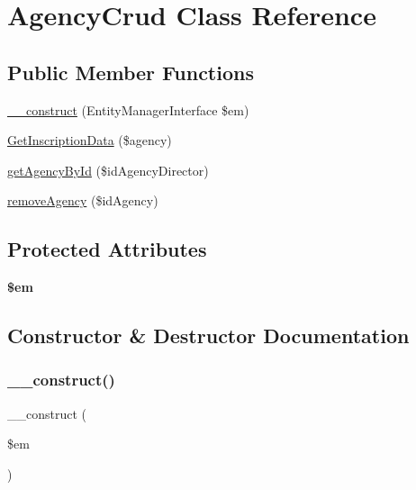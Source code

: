 \hypertarget{class_app_1_1_d_a_l_1_1_agency_crud}{}\section{Agency\+Crud Class Reference}
\label{class_app_1_1_d_a_l_1_1_agency_crud}
\subsection*{Public Member Functions}
\begin{DoxyCompactItemize}
\item 
\mbox{\hyperlink{class_app_1_1_d_a_l_1_1_agency_crud_a25f4258aeb5ce2a61a2504cb7c058485}{\+\_\+\+\_\+construct}} (Entity\+Manager\+Interface \$em)
\item 
\mbox{\hyperlink{class_app_1_1_d_a_l_1_1_agency_crud_a6be585abbc3ecd13be7ce55b17684201}{Get\+Inscription\+Data}} (\$agency)
\item 
\mbox{\hyperlink{class_app_1_1_d_a_l_1_1_agency_crud_a54229573070f2b5cf281e41d8df7a469}{get\+Agency\+By\+Id}} (\$id\+Agency\+Director)
\item 
\mbox{\hyperlink{class_app_1_1_d_a_l_1_1_agency_crud_aaed7f556480a380f61b2a61cac7c83e9}{remove\+Agency}} (\$id\+Agency)
\end{DoxyCompactItemize}
\subsection*{Protected Attributes}
\begin{DoxyCompactItemize}
\item 
\mbox{\label{class_app_1_1_d_a_l_1_1_agency_crud_a0f2991d5fed029ef50ef619f1a532d06}} 
{\bfseries \$em}
\end{DoxyCompactItemize}


\subsection{Constructor \& Destructor Documentation}
\mbox{\label{class_app_1_1_d_a_l_1_1_agency_crud_a25f4258aeb5ce2a61a2504cb7c058485}} 
\subsubsection{\texorpdfstring{\_\_construct()}{\_\_construct()}}
{\footnotesize\ttfamily \+\_\+\+\_\+construct (\begin{DoxyParamCaption}\item[{Entity\+Manager\+Interface}]{\$em }\end{DoxyParamCaption})}

